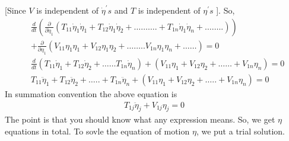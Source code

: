 [Since $V$ is independent of $\dot{\eta}^{\prime} s$ and $T$ is independent of $\eta^{\prime} s$ ]. So,
\begin{align*}
&\frac{d}{d t}\left(\frac{\partial}{\partial \dot{\eta}_{1}}\left(T_{11} \dot{\eta}_{1} \dot{\eta}_{1}+T_{12} \dot{\eta}_{1} \dot{\eta}_{2}+\ldots \ldots \ldots .+T_{1 n} \dot{\eta}_{1} \dot{\eta}_{n}+\ldots \ldots . .\right)\right)\\
&+\frac{\partial}{\partial \eta_{1}}\left(V_{11} \eta_{1} \eta_{1}+V_{12} \eta_{1} \eta_{2}+\ldots \ldots . . V_{1 n} \eta_{1} \eta_{n}+\ldots \ldots\right)=0 \\
&\frac{d}{d t}\left(T_{11} \dot{\eta}_{1}+T_{12} \dot{\eta}_{2}+\ldots \ldots T_{1 n} \dot{\eta}_{n}\right)+\left(V_{11} \eta_{1}+V_{12} \eta_{2}+\ldots \ldots+V_{1 n} \eta_{n}\right)=0 \\
&T_{11} \ddot{\eta}_{1}+T_{12} \ddot{\eta}_{2}+\ldots . .+T_{1 n} \ddot{\eta}_{n}+\left(V_{11} \eta_{1}+V_{12} \eta_{2}+\ldots . .+V_{1 n} \eta_{n}\right)=0
\end{align*}
In summation convention the above equation is
\begin{align}
T_{1 j} \ddot{\eta}_{j}+V_{1 j} \eta_{j}=0\label{ref10}
\end{align}
The point is that you should know what any expression means. So, we get $\eta$ equations in total.
To sovle the equation of motion $\eta$, we put a trial solution.

